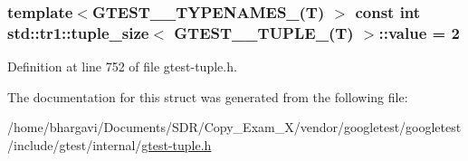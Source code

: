 \subsubsection[{\texorpdfstring{value}{value}}]{\setlength{\rightskip}{0pt plus 5cm}template$<$G\+T\+E\+S\+T\+\_\+\_\+\+T\+Y\+P\+E\+N\+A\+M\+E\+S\+\_\+(\+T) $>$ const int {\bf std\+::tr1\+::tuple\+\_\+size}$<$ {\bf G\+T\+E\+S\+T\+\_\+\_\+\+T\+U\+P\+L\+E\+\_\+}({\bf T}) $>$\+::value = 2\hspace{0.3cm}{\ttfamily [static]}}\hypertarget{structstd_1_1tr1_1_1tuple__size_3_01_g_t_e_s_t__2___t_u_p_l_e___07_t_08_01_4_a18545d733fa1f811712aa1153d8ba5d9}{}\label{structstd_1_1tr1_1_1tuple__size_3_01_g_t_e_s_t__2___t_u_p_l_e___07_t_08_01_4_a18545d733fa1f811712aa1153d8ba5d9}


Definition at line 752 of file gtest-\/tuple.\+h.



The documentation for this struct was generated from the following file\+:\begin{DoxyCompactItemize}
\item 
/home/bhargavi/\+Documents/\+S\+D\+R/\+Copy\+\_\+\+Exam\+\_\+X/vendor/googletest/googletest/include/gtest/internal/\hyperlink{gtest-tuple_8h}{gtest-\/tuple.\+h}\end{DoxyCompactItemize}
